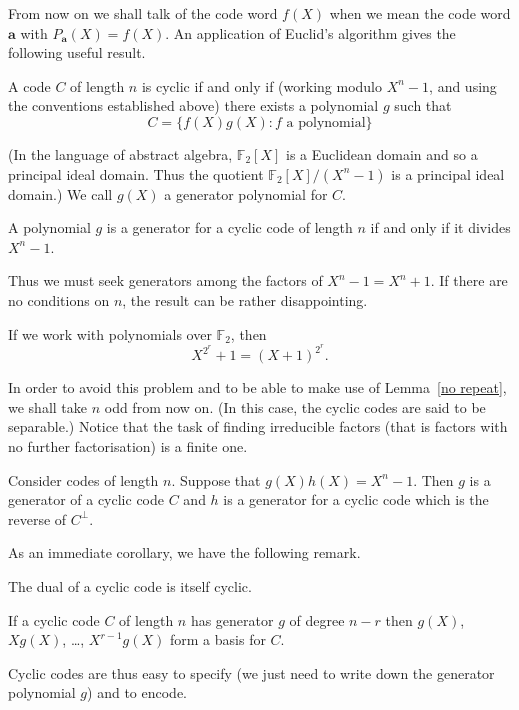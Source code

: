 From now on we shall talk of the code word $f(X)$
when we mean the code word ${\mathbf a}$ with
$P_{\mathbf a}(X)=f(X)$. An application
of Euclid's algorithm gives the following useful
result.
\begin{lemma} A code $C$ of length $n$ is
cyclic if and only if (working modulo
$X^{n}-1$, and using the conventions established
above) there exists a polynomial $g$ such that
\[C=\{f(X)g(X):\text{$f$ a polynomial}\}\]
\end{lemma}

\noindent (In the language of abstract algebra,
${\mathbb F}_{2}[X]$ is a Euclidean domain
and so a principal ideal domain. Thus the
quotient ${\mathbb F}_{2}[X]/(X^{n}-1)$ is
a principal ideal domain.) We call $g(X)$
a generator polynomial for $C$.

\begin{lemma} A polynomial $g$ is a generator
for a cyclic code of length $n$ if and
only if it divides $X^{n}-1$.
\end{lemma}
Thus we must seek generators among the
factors of $X^{n}-1=X^{n}+1$.
If there are no conditions on $n$,
the result can be rather disappointing.
\begin{exercise} If we work with polynomials over
${\mathbb F}_{2}$, then
\[X^{2^{r}}+1=(X+1)^{2^{r}}.\]
\end{exercise}

In order to avoid this problem
and to be able to make use of
Lemma~\ref{no repeat}, we shall
take $n$ odd from now on. (In this case,
the cyclic codes are said to be separable.)
Notice that the task of finding
irreducible factors  (that is factors with
no further factorisation) is a finite one.

\begin{lemma} Consider codes of length $n$.
Suppose that $g(X)h(X)=X^{n}-1$. Then $g$
is a generator of a cyclic code $C$
and $h$ is a generator for a cyclic code
which is the reverse of $C^{\perp}$.
\end{lemma}
As an immediate corollary, we have the following
remark.
\begin{lemma} The dual of a cyclic code
is itself cyclic.
\end{lemma}
\begin{lemma}\label{cyclic basis}
If a cyclic code $C$ of length
$n$ has generator $g$ of degree $n-r$ then
$g(X)$, $Xg(X)$, \dots, $X^{r-1}g(X)$
form a basis for $C$.
\end{lemma}
Cyclic codes are thus easy to specify
(we just need to write down the generator
polynomial $g$) and to encode.

